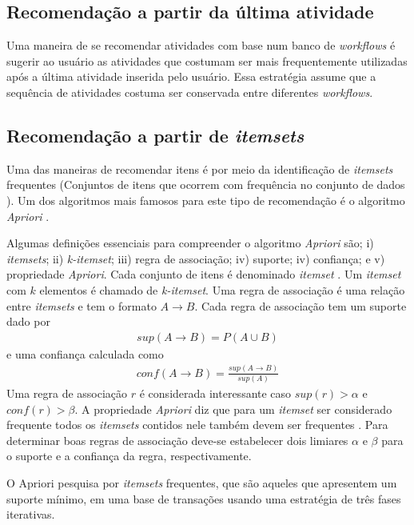 \subsection{Recomendação a partir da última atividade}
Uma maneira de se recomendar atividades com base num banco de \emph{workflows} é sugerir ao usuário as atividades que costumam ser mais frequentemente utilizadas após a última atividade inserida pelo usuário. Essa estratégia assume que a sequência de atividades costuma ser conservada entre diferentes \emph{workflows}.

\subsection{Recomendação a partir de \emph{itemsets}}\label{AAPRIORI}
Uma das maneiras de recomendar itens é por meio da identificação de \emph{itemsets} frequentes (Conjuntos de itens que ocorrem com frequência no conjunto de dados \cite{HanKamber2011}). Um dos algoritmos mais famosos para este tipo de recomendação é o algoritmo \emph{Apriori} \cite{Agrawal1994}.

Algumas definições essenciais para compreender o algoritmo \emph{Apriori} são; i) \emph{itemsets}; ii) \emph{k-itemset}; iii) regra de associação; iv) suporte; iv) confiança; e v) propriedade \emph{Apriori}. Cada conjunto de itens é denominado \emph{itemset} \cite{HanKamber2011}. Um \emph{itemset} com \(k\) elementos é chamado de \emph{k-itemset}. Uma regra de associação é uma relação entre \emph{itemsets} e tem o formato \(A \rightarrow B\). Cada regra de associação tem um suporte dado por
\begin{align}
sup(A \rightarrow B) =  P(A \cup B)
\end{align}
e uma confiança calculada como
\begin{align}
conf(A \rightarrow B) =  \frac{sup(A \rightarrow B)}{sup(A)}
\end{align}
Uma regra de associação \(r\) é considerada interessante caso \(sup(r) > \alpha\) e \(conf(r) > \beta\). A propriedade \emph{Apriori} diz que para um \emph{itemset} ser considerado frequente todos os \emph{itemsets} contidos nele também devem ser frequentes \cite{HanKamber2011}. Para determinar boas regras de associação deve-se estabelecer dois limiares \(\alpha\) e \(\beta\) para o suporte e a confiança da regra, respectivamente.

O Apriori pesquisa por \emph{itemsets} frequentes, que são aqueles que apresentem um suporte mínimo, em uma base de transações usando uma estratégia de três fases iterativas. 

